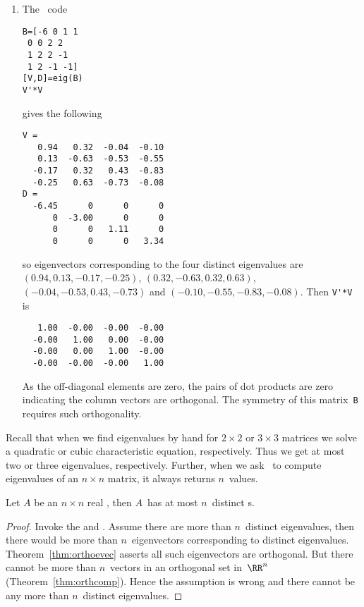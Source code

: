 \begin{example}
\begin{solution}
\begin{enumerate}
\item The \script\ code 
\setbox\ajrqrbox\hbox{}%
\marginpar{\usebox{\ajrqrbox}}%
\begin{verbatim}
B=[-6 0 1 1
 0 0 2 2
 1 2 2 -1
 1 2 -1 -1]
[V,D]=eig(B)
V'*V
\end{verbatim}
gives the following \twodp
\begin{verbatim}
V =
   0.94   0.32  -0.04  -0.10
   0.13  -0.63  -0.53  -0.55
  -0.17   0.32   0.43  -0.83
  -0.25   0.63  -0.73  -0.08
D =
  -6.45      0      0      0
      0  -3.00      0      0
      0      0   1.11      0
      0      0      0   3.34
\end{verbatim}
so eigenvectors corresponding to the four distinct eigenvalues are
\((0.94,0.13,-0.17,-0.25)\), \((0.32,-0.63,0.32,0.63)\), \((-0.04,-0.53,0.43,-0.73)\) and \((-0.10,-0.55,-0.83,-0.08)\).
Then \verb|V'*V| is \twodp
\begin{verbatim}
   1.00  -0.00  -0.00  -0.00
  -0.00   1.00   0.00  -0.00
  -0.00   0.00   1.00  -0.00
  -0.00  -0.00  -0.00   1.00
\end{verbatim}
As the off-diagonal elements are zero, the pairs of dot products are zero indicating the column vectors are orthogonal.  
The symmetry of this matrix~\verb|B| requires such orthogonality.
\end{enumerate}
\end{solution}
\end{example}





Recall that when we find eigenvalues by hand for \(2\times2\) or \(3\times 3\) matrices we solve a quadratic or cubic characteristic equation, respectively.
Thus we get at most two or three eigenvalues, respectively.
Further, when we ask \script\ to compute eigenvalues of an \(n\times n\) matrix, it always returns \(n\)~values.


\begin{theorem} \label{thm:lenlam}
Let \(A\) be an \(n\times n\) real , then \(A\)~has at most \(n\)~distinct s.
\end{theorem}
\begin{proof} 
Invoke the  and . 
Assume there are more than \(n\)~distinct eigenvalues, then there would be more than \(n\)~eigenvectors corresponding to distinct eigenvalues.
Theorem~\ref{thm:orthoevec} asserts all such eigenvectors are orthogonal. 
But there cannot be more than \(n\)~vectors in an orthogonal set in~\(\RR^n\) (Theorem~\ref{thm:orthcomp}).
Hence the assumption is wrong and there cannot be any more than \(n\)~distinct eigenvalues.
\end{proof}


